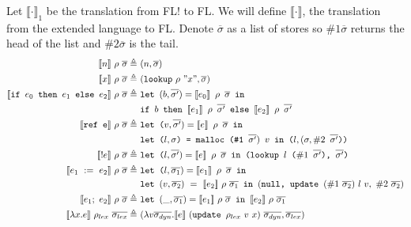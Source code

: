 \documentclass[10pt]{article}
\begin{document}
\begin{enumerate} [(a)]
    Let $\llbracket \cdot \rrbracket_1$ be the translation from FL! to FL. We will define $\llbracket \cdot \rrbracket$, the translation from the extended language to FL. Denote $\overline{\sigma}$ as a list of stores so $\# 1 \overline{\sigma}$ returns the head of the list and $\# 2 \overline{\sigma}$ is the tail.
    \begin{align*}
    \llbracket n\rrbracket~\rho~\overline{\sigma} \triangleq&~(n, \overline{\sigma})\\
    \llbracket x\rrbracket~\rho~\overline{\sigma} \triangleq&~(\texttt{lookup}~\rho~"x", \overline{\sigma})\\
    \llbracket \texttt{if $e_0$ then $e_1$ else $e_2$}\rrbracket~\rho~\overline{\sigma} \triangleq&~ \texttt{let $(b,\overline{\sigma'}) = \llbracket e_0 \rrbracket~\rho~\overline \sigma$ in }\\
    &~\texttt{if $b$ then $\llbracket e_1 \rrbracket ~\rho~\overline{\sigma'}$ else $\llbracket e_2 \rrbracket ~\rho~\overline{\sigma'}$}\\
    \llbracket \texttt{ref e}\rrbracket~\rho~\overline{\sigma} \triangleq&~\texttt{let ($v,\overline{\sigma'}) = \llbracket e \rrbracket~\rho~\overline \sigma$ in}\\
    &~\texttt{let ($l, \sigma$) = malloc (\#1~$\overline{\sigma'})~v$ in ($l, (\sigma, \#2~\overline{\sigma'}$))}\\
    \llbracket !e \rrbracket~\rho~\overline{\sigma} \triangleq&~\texttt{let ($l,\overline{\sigma'}) = \llbracket e \rrbracket~\rho~\overline \sigma$ in (lookup $l$ ($\#1~\overline{\sigma'}$), $\overline{\sigma'}$)}\\
    \llbracket e_1~:=~e_2 \rrbracket~\rho~\overline{\sigma} \triangleq&~\texttt{let ($l,\overline{\sigma_1}) = \llbracket e_1 \rrbracket~\rho~\overline \sigma$ in}\\
    &~\texttt{let } (v, \overline{\sigma_2})~=~ \llbracket e_2 \rrbracket~ \rho ~ \overline{\sigma_1} \texttt{ in } (\texttt{null, update } (\#1~\overline{\sigma_2})~l~v,~\#2~\overline{\sigma_2})\\
    \llbracket e_1;~e_2 \rrbracket~\rho~\overline{\sigma} \triangleq&~\texttt{let } (\_,\overline{\sigma_1}) = \llbracket e_1 \rrbracket~\rho~\overline \sigma \texttt{ in } \llbracket e_2 \rrbracket~\rho~\overline{\sigma_1}\\
    \llbracket \lambda x. e \rrbracket~\rho_{lex}~\overline{\sigma_{lex}} \triangleq&~( \lambda v \overline{\sigma_{dyn}}.\llbracket e \rrbracket ~ (\texttt{update } \rho_{lex} ~ v ~ x)~\overline{\sigma_{dyn}}, \overline{\sigma_{lex}})\\

\end{align*}
\end{enumerate}
\end{document}
